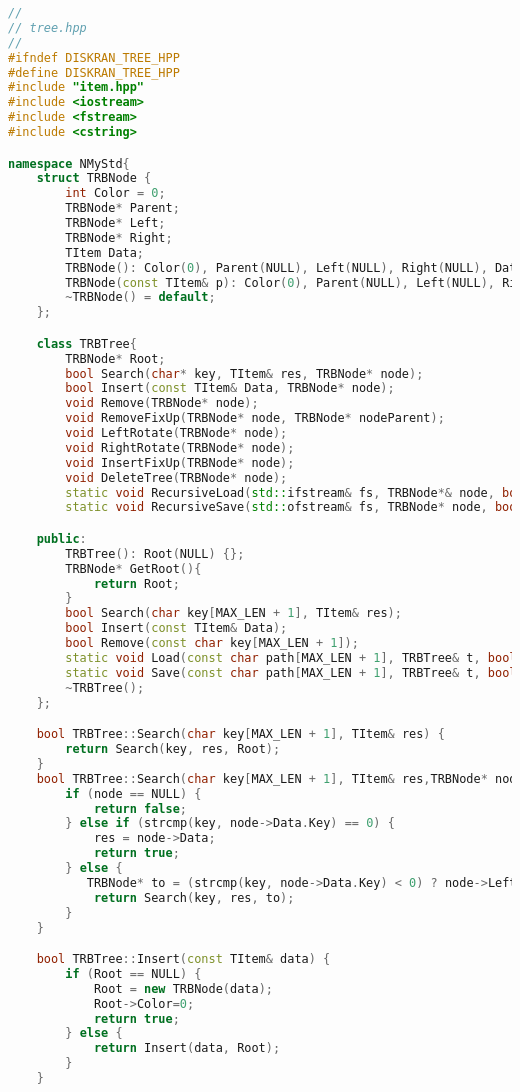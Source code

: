 \begin{lstlisting}[language=C++]
//
// tree.hpp
//
#ifndef DISKRAN_TREE_HPP
#define DISKRAN_TREE_HPP
#include "item.hpp"
#include <iostream>
#include <fstream>
#include <cstring>

namespace NMyStd{
    struct TRBNode {
        int Color = 0;
        TRBNode* Parent;
        TRBNode* Left;
        TRBNode* Right;
        TItem Data;
        TRBNode(): Color(0), Parent(NULL), Left(NULL), Right(NULL), Data() {}
        TRBNode(const TItem& p): Color(0), Parent(NULL), Left(NULL), Right(NULL), Data(p) {}
        ~TRBNode() = default;
    };

    class TRBTree{
        TRBNode* Root;
        bool Search(char* key, TItem& res, TRBNode* node);
        bool Insert(const TItem& Data, TRBNode* node);
        void Remove(TRBNode* node);
        void RemoveFixUp(TRBNode* node, TRBNode* nodeParent);
        void LeftRotate(TRBNode* node);
        void RightRotate(TRBNode* node);
        void InsertFixUp(TRBNode* node);
        void DeleteTree(TRBNode* node);
        static void RecursiveLoad(std::ifstream& fs, TRBNode*& node, bool &isOK);
        static void RecursiveSave(std::ofstream& fs, TRBNode* node, bool &isOK);

    public:
        TRBTree(): Root(NULL) {};
        TRBNode* GetRoot(){
            return Root;
        }
        bool Search(char key[MAX_LEN + 1], TItem& res);
        bool Insert(const TItem& Data);
        bool Remove(const char key[MAX_LEN + 1]);
        static void Load(const char path[MAX_LEN + 1], TRBTree& t, bool& isOK);
        static void Save(const char path[MAX_LEN + 1], TRBTree& t, bool& isOK);
        ~TRBTree();
    };

    bool TRBTree::Search(char key[MAX_LEN + 1], TItem& res) {
        return Search(key, res, Root);
    }
    bool TRBTree::Search(char key[MAX_LEN + 1], TItem& res,TRBNode* node) {
        if (node == NULL) {
            return false;
        } else if (strcmp(key, node->Data.Key) == 0) {
            res = node->Data;
            return true;
        } else {
           TRBNode* to = (strcmp(key, node->Data.Key) < 0) ? node->Left : node->Right;
            return Search(key, res, to);
        }
    }

    bool TRBTree::Insert(const TItem& data) {
        if (Root == NULL) {
            Root = new TRBNode(data);
            Root->Color=0;
            return true;
        } else {
            return Insert(data, Root);
        }
    }


\end{lstlisting}
